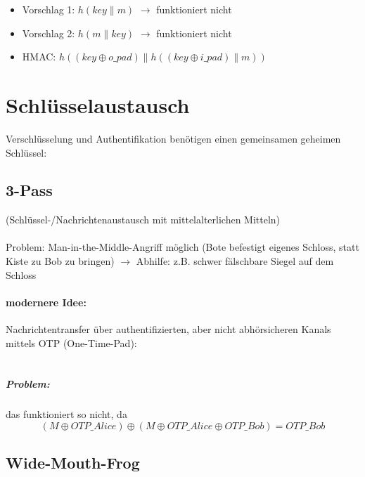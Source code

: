 \documentclass[a4paper,twoside,DIV15,BCOR12mm]{scrbook}
\begin{document}
\begin{itemize}
	\item Vorschlag 1: $h(key \| m)$ $\rightarrow$ funktioniert nicht 
	\item Vorschlag 2: $h(m \| key)$ $\rightarrow$ funktioniert nicht 
	\item HMAC: $h((key \oplus o\_pad) \| h((key \oplus i\_pad) \| m))$
\end{itemize}



\chapter{Schlüsselaustausch}

Verschlüsselung und Authentifikation benötigen einen gemeinsamen geheimen Schlüssel:

\section{3-Pass}

(Schlüssel-/Nachrichtenaustausch mit mittelalterlichen Mitteln)\\

\\

Problem: Man-in-the-Middle-Angriff möglich (Bote befestigt eigenes Schloss, statt Kiste zu Bob zu bringen) $\rightarrow$ Abhilfe: z.B. schwer fälschbare Siegel auf dem Schloss

\subsubsection{modernere Idee:}

Nachrichtentransfer über authentifizierten, aber nicht abhörsicheren Kanals mittels OTP (One-Time-Pad):\\

\\

\paragraph{Problem:} das funktioniert so nicht, da $$(M \oplus OTP\_Alice) \oplus (M \oplus OTP\_Alice \oplus OTP\_Bob) = OTP\_Bob$$

\section{Wide-Mouth-Frog}
\end{document}
